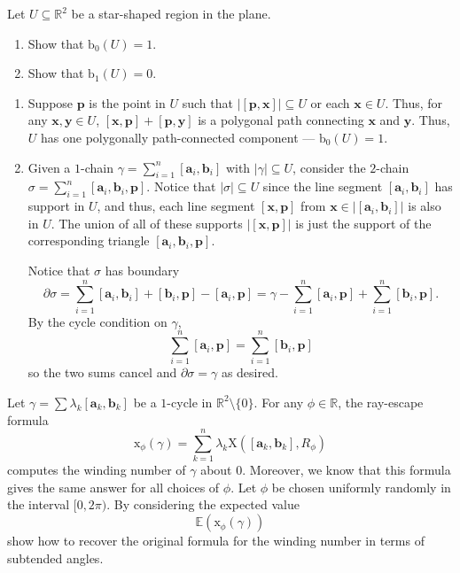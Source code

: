 \documentclass[12 pt, letterpaper]{hmcpset}
\begin{document}
\begin{problem}[28.]
	Let $U \subseteq \mathbb{R}^{2}$ be a star-shaped region in the plane.
	\begin{enumerate}
		\item Show that $\mathrm{b}_{0}(U) = 1$.
		\item Show that $\mathrm{b}_{1}(U) = 0$.
	\end{enumerate}
\end{problem}

\begin{solution}
	\begin{enumerate}
		\item Suppose $\mathbf{p}$ is the point in $U$ such that $\lvert [\mathbf{p}, \mathbf{x}] \rvert \subseteq U$ or each $\mathbf{x} \in U$. Thus, for any $\mathbf{x}, \mathbf{y} \in U$, $[\mathbf{x}, \mathbf{p}] + [\mathbf{p}, \mathbf{y}]$ is a polygonal path connecting $\mathbf{x}$ and $\mathbf{y}$. Thus, $U$ has one polygonally path-connected component --- $\mathrm{b}_{0}(U) = 1$.
		\item Given a $1$-chain $\gamma = \sum_{i = 1}^{n} [\mathbf{a}_{i}, \mathbf{b}_{i}]$ with $\lvert \gamma \rvert \subseteq U$, consider the $2$-chain $\sigma = \sum_{i = 1}^{n} [\mathbf{a}_{i}, \mathbf{b}_{i}, \mathbf{p}]$. Notice that $\lvert \sigma \rvert \subseteq U$ since the line segment $[\mathbf{a}_{i}, \mathbf{b}_{i}]$ has support in $U$, and thus, each line segment $[\mathbf{x}, \mathbf{p}]$ from $\mathbf{x} \in \lvert [\mathbf{a}_{i}, \mathbf{b}_{i}] \rvert$ is also in $U$. The union of all of these supports $\lvert [\mathbf{x}, \mathbf{p}] \rvert$ is just the support of the corresponding triangle $[\mathbf{a}_{i}, \mathbf{b}_{i}, \mathbf{p}]$.

			Notice that $\sigma$ has boundary
			\[
				\partial \sigma = \sum_{i = 1}^{n} [\mathbf{a}_{i}, \mathbf{b}_{i}] + [\mathbf{b}_{i}, \mathbf{p}] - [\mathbf{a}_{i}, \mathbf{p}] = \gamma - \sum_{i = 1}^{n} [\mathbf{a}_{i}, \mathbf{p}] + \sum_{i = 1}^{n} [\mathbf{b}_{i}, \mathbf{p}].
			\]
			By the cycle condition on $\gamma$,
			\[
				\sum_{i = 1}^{n} [\mathbf{a}_{i}, \mathbf{p}] = \sum_{i = 1}^{n} [\mathbf{b}_{i}, \mathbf{p}]
			\]
			so the two sums cancel and $\partial \sigma = \gamma$ as desired.
	\end{enumerate}
\end{solution}

\pagebreak

\begin{problem}[29.]
	Let $\gamma = \sum \lambda_{k} [\mathbf{a}_{k}, \mathbf{b}_{k}]$ be a $1$-cycle in $\mathbb{R}^{2} \setminus \{ 0 \}$. For any $\phi \in \mathbb{R}$, the ray-escape formula
	\[
		\mathrm{x}_{\phi}(\gamma) = \sum_{k = 1}^{n} \lambda_{k} \mathrm{X}([\mathbf{a}_{k}, \mathbf{b}_{k}], R_{\phi})
	\]
	computes the winding number of $\gamma$ about $0$. Moreover, we know that this formula gives the same answer for all choices of $\phi$. Let $\phi$ be chosen uniformly randomly in the interval $[0, 2 \pi)$. By considering the expected value
	\[
		\mathbb{E}(\mathrm{x}_{\phi}(\gamma))
	\]
	show how to recover the original formula for the winding number in terms of subtended angles.
\end{problem}
\end{document}
